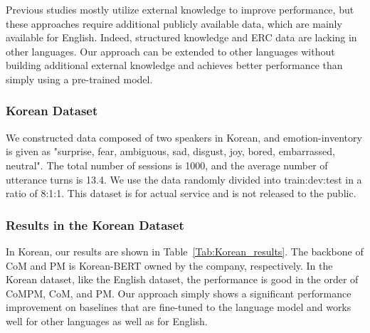 \documentclass[11pt]{article}
\begin{document}
Previous studies mostly utilize external knowledge to improve performance, but these approaches require additional publicly available data, which are mainly available for English. Indeed, structured knowledge and ERC data are lacking in other languages. Our approach can be extended to other languages without building additional external knowledge and achieves better performance than simply using a pre-trained model.


\subsubsection{Korean Dataset}
We constructed data composed of two speakers in Korean, and emotion-inventory is given as "surprise, fear, ambiguous, sad, disgust, joy, bored, embarrassed, neutral". The total number of sessions is 1000, and the average number of utterance turns is 13.4. We use the data randomly divided into train:dev:test in a ratio of 8:1:1. This dataset is for actual service and is not released to the public.


\subsubsection{Results in the Korean Dataset}

\begin{table}[!h]
\centering
{}
\caption{Results of our approaches in Korean.}
\label{Tab:Korean_results}
\end{table}

In Korean, our results are shown in Table~\ref{Tab:Korean_results}. The backbone of CoM and PM is Korean-BERT owned by the company, respectively. In the Korean dataset, like the English dataset, the performance is good in the order of CoMPM, CoM, and PM. Our approach simply shows a significant performance improvement on baselines that are fine-tuned to the language model and works well for other languages as well as for English.
\end{document}

